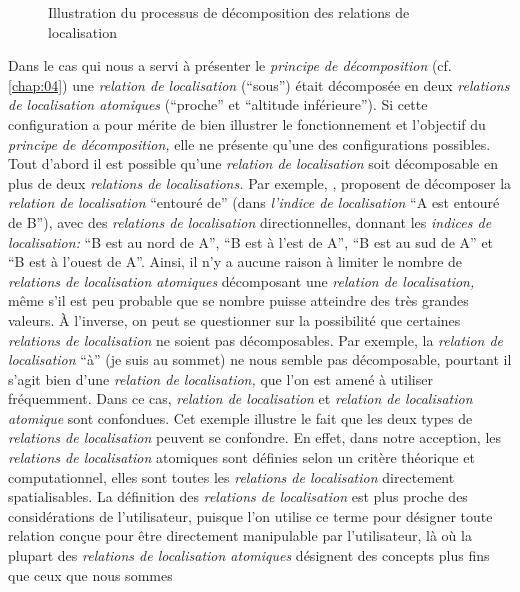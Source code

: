 \begin{figure}
  \centering
  
  \caption{Illustration du processus de décomposition des relations de
  localisation}
  \label{fig:logique_dec}
\end{figure}

Dans le cas qui nous a servi à présenter le \emph{principe de
  décomposition} (cf. \autoref{chap:04}) une \emph{relation de
  localisation} (\enquote{sous}) était décomposée en deux
\emph{relations de localisation atomiques} (\enquote{proche} et
\enquote{altitude inférieure}). Si cette configuration a pour mérite
de bien illustrer le fonctionnement et l'objectif du \emph{principe de
  décomposition,} elle ne présente qu'une des configurations
possibles. Tout d'abord il est possible qu'une \emph{relation de
  localisation} soit décomposable en plus de deux \emph{relations de
  localisations.} Par exemple, \textcite{Vanegas2011}, proposent de
décomposer la \emph{relation de localisation} \enquote{entouré de}
(dans \emph{l'indice de localisation} \enquote{A est entouré de B}),
avec des \emph{relations de localisation} directionnelles, donnant les
\emph{indices de localisation:} \enquote{B est au nord de A},
\enquote{B est à l'est de A}, \enquote{B est au sud de A} et
\enquote{B est à l'ouest de A}. Ainsi, il n'y a aucune raison à
limiter le nombre de \emph{relations de localisation atomiques}
décomposant une \emph{relation de localisation,} même s'il est peu
probable que se nombre puisse atteindre des très grandes valeurs. À
l'inverse, on peut se questionner sur la possibilité que certaines
\emph{relations de localisation} ne soient pas décomposables. Par
exemple, la \emph{relation de localisation} \enquote{à} (\eg je suis
au sommet) ne nous semble pas décomposable, pourtant il s'agit bien
d'une \emph{relation de localisation,} que l'on est amené à utiliser
fréquemment. Dans ce cas, \emph{relation de localisation} et
\emph{relation de localisation atomique} sont confondues. Cet exemple
illustre le fait que les deux types de \emph{relations de
  localisation} peuvent se confondre. En effet, dans notre acception,
les \emph{relations de localisation} atomiques sont définies selon un
critère théorique et computationnel, elles sont toutes les
\emph{relations de localisation} directement spatialisables. La
définition des \emph{relations de localisation} est plus proche des
considérations de l'utilisateur, puisque l'on utilise ce terme pour
désigner toute relation conçue pour être directement manipulable par
l'utilisateur, là où la plupart des \emph{relations de localisation
  atomiques} désignent des concepts plus fins que ceux que nous sommes
